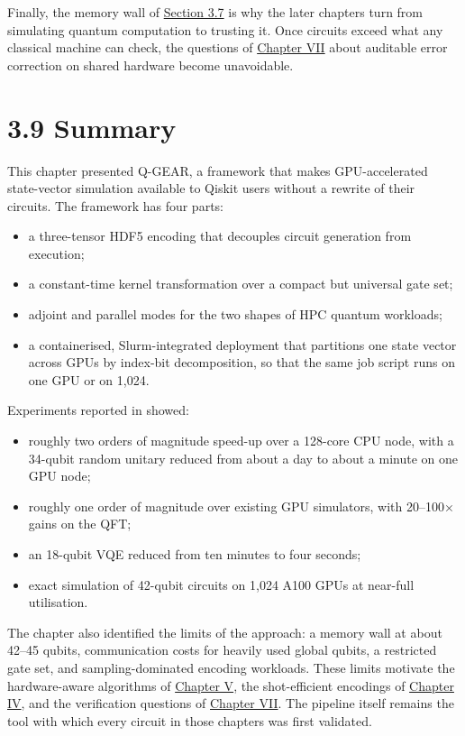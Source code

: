 \documentclass{report}
\theoremstyle{plain}
\theoremstyle{definition}
\theoremstyle{remark}
\begin{document}
Finally, the memory wall of \hyperref[sec:qgear:discussion]{Section 3.7} is why the later chapters turn from simulating quantum computation to trusting it. Once circuits exceed what any classical machine can check, the questions of \hyperref[ch:qec]{Chapter VII} about auditable error correction on shared hardware become unavoidable.

\section{3.9 Summary}\label{sec:qgear:summary}

This chapter presented Q-GEAR, a framework that makes GPU-accelerated state-vector simulation available to Qiskit users without a rewrite of their circuits. The framework has four parts:
\begin{itemize}
  \item a three-tensor HDF5 encoding that decouples circuit generation from execution;
  \item a constant-time kernel transformation over a compact but universal gate set;
  \item adjoint and parallel modes for the two shapes of HPC quantum workloads;
  \item a containerised, Slurm-integrated deployment that partitions one state vector across GPUs by index-bit decomposition, so that the same job script runs on one GPU or on 1,024.
\end{itemize}
Experiments reported in \cite{guo2025qgear} showed:
\begin{itemize}
  \item roughly two orders of magnitude speed-up over a 128-core CPU node, with a 34-qubit random unitary reduced from about a day to about a minute on one GPU node;
  \item roughly one order of magnitude over existing GPU simulators, with 20--100$\times$ gains on the QFT;
  \item an 18-qubit VQE reduced from ten minutes to four seconds;
  \item exact simulation of 42-qubit circuits on 1,024 A100 GPUs at near-full utilisation.
\end{itemize}
The chapter also identified the limits of the approach: a memory wall at about 42--45 qubits, communication costs for heavily used global qubits, a restricted gate set, and sampling-dominated encoding workloads. These limits motivate the hardware-aware algorithms of \hyperref[ch:nisq]{Chapter V}, the shot-efficient encodings of \hyperref[ch:qml]{Chapter IV}, and the verification questions of \hyperref[ch:qec]{Chapter VII}. The pipeline itself remains the tool with which every circuit in those chapters was first validated.
\end{document}
